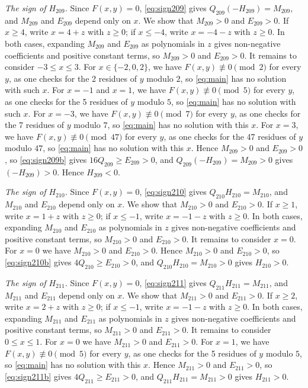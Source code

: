 \documentclass[11pt]{article}
\begin{document}
\emph{The sign of $H_{209}$.} Since $F(x,y)=0$, \eqref{eq:sign209} gives $Q_{209}(-H_{209})=M_{209}$, and $M_{209}$ and $E_{209}$ depend only on $x$. We show that $M_{209}>0$ and $E_{209}>0$. If $x\geq4$, write $x=4+z$ with $z\geq0$; if $x\leq-4$, write $x=-4-z$ with $z\geq0$. In both cases, expanding $M_{209}$ and $E_{209}$ as polynomials in $z$ gives non-negative coefficients and positive constant terms, so $M_{209}>0$ and $E_{209}>0$. It remains to consider $-3\leq x\leq3$. For $x\in\{-2,\allowbreak 0,\allowbreak 2\}$, we have $F(x,y)\not\equiv0\pmod{2}$ for every $y$, as one checks for the 2 residues of $y$ modulo $2$, so \eqref{eq:main} has no solution with such $x$. For $x=-1$ and $x=1$, we have $F(x,y)\not\equiv0\pmod{5}$ for every $y$, as one checks for the 5 residues of $y$ modulo $5$, so \eqref{eq:main} has no solution with such $x$. For $x=-3$, we have $F(x,y)\not\equiv0\pmod{7}$ for every $y$, as one checks for the 7 residues of $y$ modulo $7$, so \eqref{eq:main} has no solution with this $x$. For $x=3$, we have $F(x,y)\not\equiv0\pmod{47}$ for every $y$, as one checks for the 47 residues of $y$ modulo $47$, so \eqref{eq:main} has no solution with this $x$. Hence $M_{209}>0$ and $E_{209}>0$, so \eqref{eq:sign209b} gives $16Q_{209}\geq E_{209}>0$, and $Q_{209}(-H_{209})=M_{209}>0$ gives $(-H_{209})>0$. Hence $H_{209}<0$.

\emph{The sign of $H_{210}$.} Since $F(x,y)=0$, \eqref{eq:sign210} gives $Q_{210}H_{210}=M_{210}$, and $M_{210}$ and $E_{210}$ depend only on $x$. We show that $M_{210}>0$ and $E_{210}>0$. If $x\geq1$, write $x=1+z$ with $z\geq0$; if $x\leq-1$, write $x=-1-z$ with $z\geq0$. In both cases, expanding $M_{210}$ and $E_{210}$ as polynomials in $z$ gives non-negative coefficients and positive constant terms, so $M_{210}>0$ and $E_{210}>0$. It remains to consider $x=0$. For $x=0$ we have $M_{210}>0$ and $E_{210}>0$. Hence $M_{210}>0$ and $E_{210}>0$, so \eqref{eq:sign210b} gives $4Q_{210}\geq E_{210}>0$, and $Q_{210}H_{210}=M_{210}>0$ gives $H_{210}>0$.

\emph{The sign of $H_{211}$.} Since $F(x,y)=0$, \eqref{eq:sign211} gives $Q_{211}H_{211}=M_{211}$, and $M_{211}$ and $E_{211}$ depend only on $x$. We show that $M_{211}>0$ and $E_{211}>0$. If $x\geq2$, write $x=2+z$ with $z\geq0$; if $x\leq-1$, write $x=-1-z$ with $z\geq0$. In both cases, expanding $M_{211}$ and $E_{211}$ as polynomials in $z$ gives non-negative coefficients and positive constant terms, so $M_{211}>0$ and $E_{211}>0$. It remains to consider $0\leq x\leq1$. For $x=0$ we have $M_{211}>0$ and $E_{211}>0$. For $x=1$, we have $F(x,y)\not\equiv0\pmod{5}$ for every $y$, as one checks for the 5 residues of $y$ modulo $5$, so \eqref{eq:main} has no solution with this $x$. Hence $M_{211}>0$ and $E_{211}>0$, so \eqref{eq:sign211b} gives $4Q_{211}\geq E_{211}>0$, and $Q_{211}H_{211}=M_{211}>0$ gives $H_{211}>0$.
\end{document}
